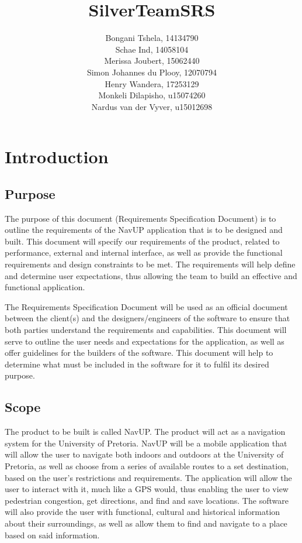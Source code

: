 \documentclass[11pt]{article}
\title{\Huge SilverTeamSRS}
\author{{\Large Bongani Tshela, 14134790 \\
        \Large Schae Ind, 14058104 \\ 
        \Large Merissa Joubert, 15062440 \\
        \Large Simon Johannes du Plooy, 12070794 \\
        \Large Henry Wandera, 17253129 \\
        \Large Monkeli Dilapisho, u15074260 \\
        \Large Nardus van der Vyver,  u15012698 \\
            }}
\begin{document}


\pagebreak

\section{Introduction}
	\subsection{Purpose}

	The purpose of this document (Requirements Specification Document) is to outline the requirements of the NavUP application that is to be designed and built. This document will specify our requirements of the product, related to performance, external and internal interface, as well as provide the functional requirements and design constraints to be met. The requirements will help define and determine user expectations, thus allowing the team to build an effective and functional application. 

\vspace{\baselineskip}
The Requirements Specification Document will be used as an official document between the client(s) and the designers/engineers of the software to ensure that both parties understand the requirements and capabilities. This document will serve to outline the user needs and expectations for the application, as well as offer guidelines for the builders of the software. This document will help to determine what must be included in the software for it to fulfil its desired purpose.


	\subsection{Scope}

	The product to be built is called NavUP. The product will act as a navigation system for the University of Pretoria. NavUP will be a mobile application that will allow the user to navigate both indoors and outdoors at the University of Pretoria, as well as choose from a series of available routes to a set destination, based on the user’s restrictions and requirements. The application will allow the user to interact with it, much like a GPS would, thus enabling the user to view pedestrian congestion, get directions, and find and save locations. The software will also provide the user with functional, cultural and historical information about their surroundings, as well as allow them to find and navigate to a place based on said information.
\vspace{\baselineskip}
\end{document}
